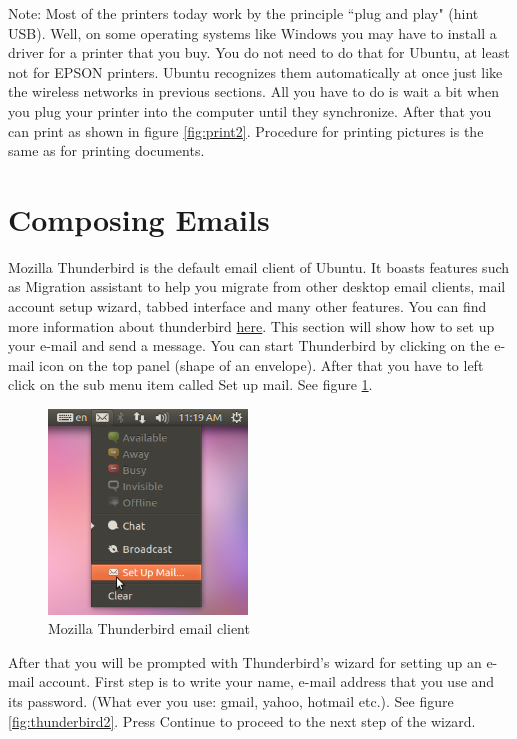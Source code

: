 \par \noindent Note: Most of the printers today work by the principle ``plug and play"  (hint USB).  Well, on some operating systems like Windows you may have to install a driver for a printer that you buy. You do not need to do that for Ubuntu, at least not for EPSON printers. Ubuntu recognizes them automatically at once just like the wireless networks in previous sections. All you have to do is wait a bit when you plug your printer into the computer until they synchronize. After that you can print as shown in figure \ref{fig:print2}. Procedure for printing pictures is the same as for printing documents.

\section{Composing Emails} 
Mozilla Thunderbird is the default email client of Ubuntu. It boasts features such as Migration assistant to help you migrate from other desktop email clients, mail account setup wizard, tabbed interface and many other features. You can find more information about thunderbird \href{http://www.mozilla.org/en-US/thunderbird/features/}{here}. This section will show how to set up your e-mail and send a message. You can start Thunderbird by clicking on the e-mail icon on the top panel (shape of an envelope).  After that you have to left click on the sub menu item called Set up mail. See figure \ref{fig:thunderbird1}. \\

\begin{figure}[h!]	
	\centering
	\includegraphics[width=150pt]{./images/basic-tasks/thunderbird1.png}
	\caption{Mozilla Thunderbird email client}	
	\label{fig:thunderbird1}		
\end{figure}

\par \noindent After that you will be prompted with Thunderbird's wizard for setting up an e-mail account. First step is to write your name,  e-mail address that you use and its password. (What ever you use: gmail, yahoo, hotmail etc.). See figure \ref{fig:thunderbird2}. Press Continue to proceed to the next step of the wizard.\\

